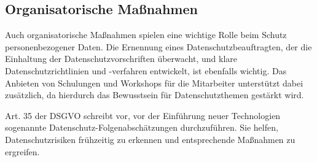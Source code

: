 \cite{conrad_2017}
\cite{mindverse2024}

\subsection{Organisatorische Maßnahmen}

Auch organisatorische Maßnahmen spielen eine wichtige Rolle beim Schutz
personenbezogener Daten. Die Ernennung eines Datenschutzbeauftragten, der die
Einhaltung der Datenschutzvorschriften überwacht, und klare
Datenschutzrichtlinien und -verfahren entwickelt, ist ebenfalls wichtig. Das
Anbieten von Schulungen und Workshops für die Mitarbeiter unterstützt dabei
zusätzlich, da hierdurch das Bewusstsein für Datenschutzthemen gestärkt wird.

Art. 35 der DSGVO schreibt vor, vor der Einführung neuer Technologien sogenannte
Datenschutz-Folgenabschätzungen durchzuführen. Sie helfen, Datenschutzrisiken
frühzeitig zu erkennen und entsprechende Maßnahmen zu ergreifen.

\cite{conrad_2017}